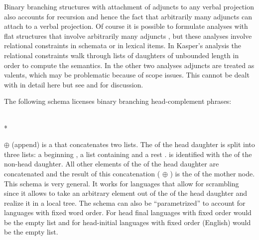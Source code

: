 \documentclass[output=paper]{langsci/langscibook}
\begin{document}
Binary branching structures with attachment of adjuncts to any verbal projection also accounts for recursion and hence the
fact that arbitrarily many adjuncts can attach to a verbal projection.
Of course it is possible to formulate analyses with flat structures that involve arbitrarily many
adjuncts \citep{Kasper94a,Noord94,BMS2001a}, but these analyses involve relational
constraints in schemata or in lexical items. In Kasper's analysis the
relational constraints walk through lists of daughters of unbounded length in order to compute the
semantics. In the other two analyses adjuncts are treated as valents, which may be problematic
because of scope issues. This cannot be dealt with in detail here but see  and
 for discussion. 

The following schema licenses binary branching head-complement phrases:
\begin{samepage}
\begin{schema}
\label{hcs-binary}
 \impl\\*
\end{schema}
\end{samepage}
$\oplus$ (append) is a  that concatenates two lists. The \compsl of the head
daughter is split into three lists: a beginning , a list containing  and a rest
.  is identified with the \synsemv of the non-head daughter. All other elements of
the \compsl of the head daughter are concatenated and the result of this concatenation (
$\oplus$ ) is the \compsl of the mother node. This schema is very general. It works for
languages that allow for scrambling since it allows to take an arbitrary element out of the \compsl
of the head daughter and realize it in a local tree. The schema can also be ``parametrized'' to account
for languages with fixed word order. For head final languages with fixed order  would be the
empty list and for head-initial languages with fixed order (\eg English)  would be the empty list.
\end{document}
